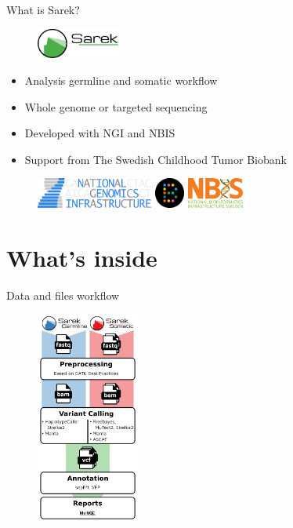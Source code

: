 \documentclass[usepdftitle=false]{beamer}
\begin{document}
\begin{frame}{What is Sarek?}
	\begin{figure}
		\includegraphics[height=1cm]{pictures/Sarek_no_border}
	\end{figure}
	\begin{itemize}
		\item Analysis germline and somatic workflow
		\item Whole genome or targeted sequencing
		\item Developed with NGI and NBIS
		\item Support from The Swedish Childhood Tumor Biobank
	\end{itemize}
	\begin{figure}
		\includegraphics[height=1cm]{pictures/NGI}
		{\hfill}
		\includegraphics[height=1cm]{pictures/Barntumorbanken}
		{\hfill}
		\includegraphics[height=1cm]{pictures/NBIS}
	\end{figure}
	\vfill
\end{frame}

\section{What's inside}

\begin{frame}{Data and files workflow}
	\begin{figure}
		\includegraphics[height=7cm]{pictures/Sarek_workflow_3}
	\end{figure}
\end{frame}
\end{document}
